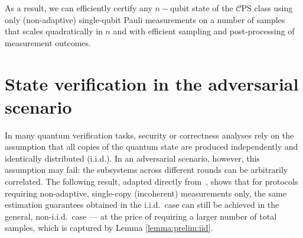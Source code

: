 \documentclass[a4paper,twocolumn,11pt,unpublished]{quantumarticle}
\newcommand{\mCEPS}{\mathcal{C}\text{PS}}
\begin{document}
        As a result, we can efficiently certify any $n-$qubit state of the $\mCEPS$ class using only (non-adaptive) single-qubit Pauli measurements on a number of samples that scales quadratically in $n$ and with efficient sampling and post-processing of measurement outcomes.
 


\section{State verification in the adversarial scenario}
\label{section:verification}

In many quantum verification tasks, security or correctness analyses rely on the assumption that all copies of the quantum state are produced independently and identically distributed (i.i.d.).
In an adversarial scenario, however, this assumption may fail: the subsystems across different rounds can be arbitrarily correlated.
The following result, adapted directly from~\cite[Theorem~3]{FKMO24learning}, shows that for protocols requiring non-adaptive, single-copy (incoherent) measurements only, the same estimation guarantees obtained in the i.i.d.\ case can still be achieved in the general, non-i.i.d.\ case — at the price of requiring a larger number of total samples, which is captured by Lemma \ref{lemma:prelim:iid}.
\end{document}
